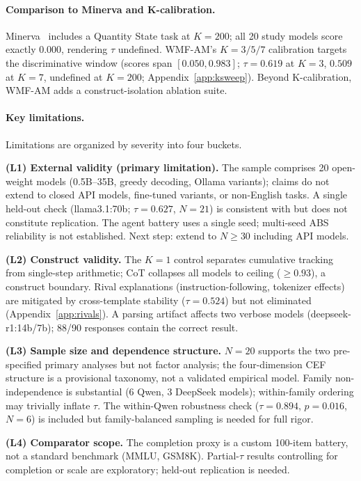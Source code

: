 \documentclass{article}
\begin{document}
\paragraph{Comparison to Minerva and K-calibration.}
Minerva~\citep{xia2025minerva} includes a Quantity State task at
$K{=}200$; all 20 study models score exactly 0.000, rendering $\tau$
undefined.
WMF-AM's $K{=}3/5/7$ calibration targets the discriminative window
(scores span $[0.050, 0.983]$; $\tau{=}0.619$ at $K{=}3$,
$0.509$ at $K{=}7$, undefined at $K{=}200$;
Appendix~\ref{app:ksweep}).
Beyond K-calibration, WMF-AM adds a construct-isolation ablation suite.

\paragraph{Key limitations.}
Limitations are organized by severity into four buckets.

\textbf{(L1) External validity (primary limitation).}
The sample comprises 20 open-weight models (0.5B--35B, greedy decoding,
Ollama variants); claims do not extend to closed API models, fine-tuned
variants, or non-English tasks. A single held-out check
(llama3.1:70b; $\tau{=}0.627$, $N{=}21$) is consistent with
but does not constitute replication.
The agent battery uses a single seed; multi-seed ABS reliability is
not established. Next step: extend to $N{\geq}30$ including API models.

\textbf{(L2) Construct validity.}
The $K{=}1$ control separates cumulative tracking from single-step
arithmetic; CoT collapses all models to ceiling ($\geq 0.93$), a
construct boundary.
Rival explanations (instruction-following, tokenizer effects) are
mitigated by cross-template stability ($\tau{=}0.524$) but not
eliminated (Appendix~\ref{app:rivals}).
A parsing artifact affects two verbose models (deepseek-r1:14b/7b);
88/90 responses contain the correct result.

\textbf{(L3) Sample size and dependence structure.}
$N{=}20$ supports the two pre-specified primary analyses but not factor
analysis; the four-dimension CEF structure is a provisional taxonomy,
not a validated empirical model. Family non-independence is substantial
(6 Qwen, 3 DeepSeek models); within-family ordering may trivially inflate
$\tau$. The within-Qwen robustness check ($\tau{=}0.894$, $p{=}0.016$,
$N{=}6$) is included but family-balanced sampling is needed for full rigor.

\textbf{(L4) Comparator scope.}
The completion proxy is a custom 100-item battery, not a standard
benchmark (MMLU, GSM8K). Partial-$\tau$ results controlling for
completion or scale are exploratory; held-out replication is needed.
\end{document}
